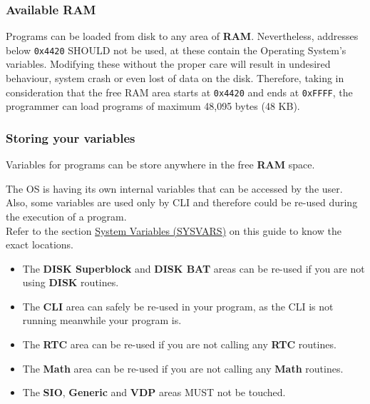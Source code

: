         \subsubsection{Available RAM}
        Programs can be loaded from disk to any area of \textbf{RAM}. Nevertheless,
        addresses below \texttt{0x4420} SHOULD not be used, at these contain the
        Operating System's variables. Modifying these without the proper care will
        result in undesired behaviour, system crash or even lost of data on the disk.
        Therefore, taking in consideration that the free RAM area starts at
        \texttt{0x4420} and ends at \texttt{0xFFFF}, the programmer can load
        programs of maximum 48,095 bytes (48 KB).

        \subsubsection{Storing your variables}
        Variables for programs can be store anywhere in the free \textbf{RAM} space.

        The OS is having its own internal variables that can be accessed by the user.
        Also, some variables are used only by CLI and therefore could be re-used
        during the execution of a program.\\

        Refer to the section \hyperref[sec:ram_memmap]{System Variables (SYSVARS)}
        on this guide to know the exact locations.

        \begin{itemize}
            \item The \textbf{DISK Superblock} and \textbf{DISK BAT} areas can be
            re-used if you are not using \textbf{DISK} routines.
            \item The \textbf{CLI} area can safely be re-used in your program, as
            the CLI is not running meanwhile your program is.
            \item The \textbf{RTC} area can be re-used if you are not calling any
            \textbf{RTC} routines.
            \item The \textbf{Math} area can be re-used if you are not calling any
            \textbf{Math} routines.
            \item The \textbf{SIO}, \textbf{Generic} and \textbf{VDP} areas MUST not
            be touched.
        \end{itemize}

